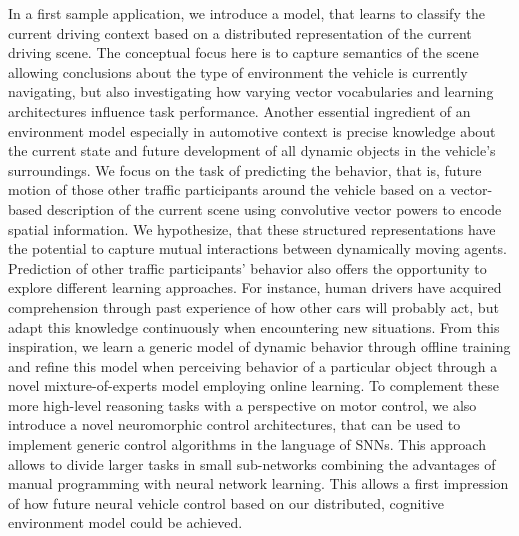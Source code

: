 In a first sample application, we introduce a model, that learns to classify the current driving context based on a distributed representation of the current driving scene. 
The conceptual focus here is to capture semantics of the scene allowing conclusions about the type of environment the vehicle is currently navigating, but also investigating how varying vector vocabularies and learning architectures influence task performance.
Another essential ingredient of an environment model especially in automotive context is precise knowledge about the current state and future development of all dynamic objects in the vehicle's surroundings.
We focus on the task of predicting the behavior, that is, future motion of those other traffic participants around the vehicle based on a vector-based description of the current scene using convolutive vector powers to encode spatial information.
We hypothesize, that these structured representations have the potential to capture mutual interactions between dynamically moving agents.
Prediction of other traffic participants' behavior also offers the opportunity to explore different learning approaches.
For instance, human drivers have acquired comprehension through past experience of how other cars will probably act, but adapt this knowledge continuously when encountering new situations.
From this inspiration, we learn a generic model of dynamic behavior through offline training and refine this model when perceiving behavior of a particular object through a novel mixture-of-experts model employing online learning.
To complement these more high-level reasoning tasks with a perspective on motor control, we also introduce a novel neuromorphic control architectures, that can be used to implement generic control algorithms in the language of \acp{SNN}.
This approach allows to divide larger tasks in small sub-networks combining the advantages of manual programming with neural network learning.
This allows a first impression of how future neural vehicle control based on our distributed, cognitive environment model could be achieved.
